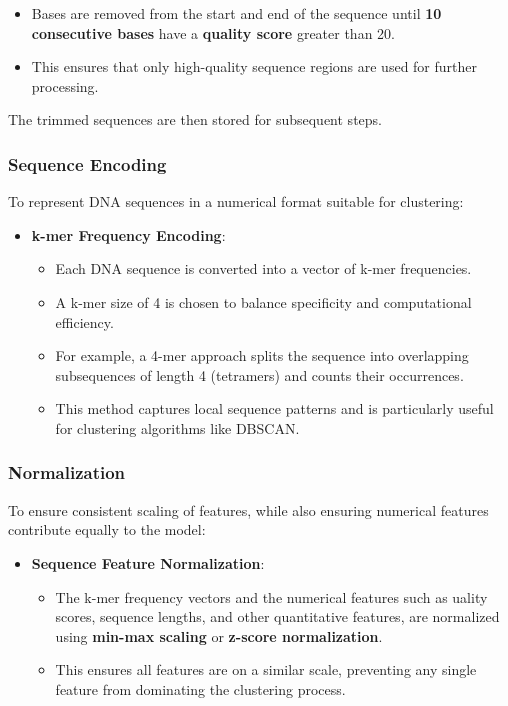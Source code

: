 \begin{itemize}
    \item Bases are removed from the start and end of the sequence until \textbf{10 consecutive bases} have a \textbf{quality score} greater than 20.
    \item This ensures that only high-quality sequence regions are used for further processing.
\end{itemize}

The trimmed sequences are then stored for subsequent steps.

\subsubsection{Sequence Encoding}
To represent DNA sequences in a numerical format suitable for clustering:
\begin{itemize}
    \item \textbf{k-mer Frequency Encoding}:
    \begin{itemize}
        \item Each DNA sequence is converted into a vector of k-mer frequencies.
        \item A k-mer size of 4 is chosen to balance specificity and computational efficiency.
        \item For example, a 4-mer approach splits the sequence into overlapping subsequences of length 4 (tetramers) and counts their occurrences.
        \item This method captures local sequence patterns and is particularly useful for clustering algorithms like DBSCAN.
    \end{itemize}
\end{itemize}

\subsubsection{Normalization}
To ensure consistent scaling of features, while also ensuring numerical features contribute equally to the model:
\begin{itemize}
    \item \textbf{Sequence Feature Normalization}:
    \begin{itemize}
        \item The k-mer frequency vectors and the numerical features such as uality scores, sequence lengths, and other quantitative features, are normalized using \textbf{min-max scaling} or \textbf{z-score normalization}.
        \item This ensures all features are on a similar scale, preventing any single feature from dominating the clustering process.
    
    \end{itemize}
\end{itemize}

